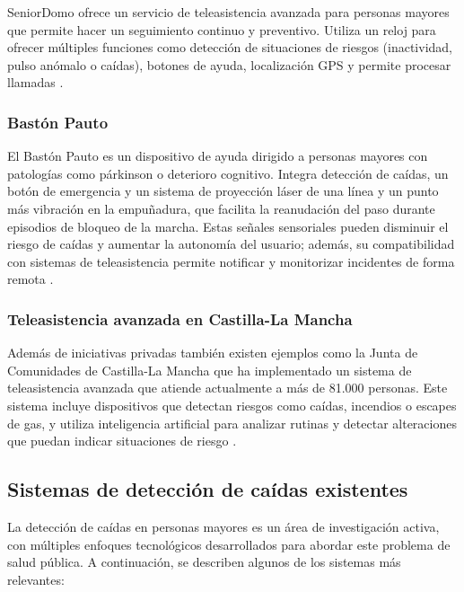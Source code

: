 \documentclass[12pt, a4paper]{article}
\begin{document}
	SeniorDomo ofrece un servicio de teleasistencia avanzada para personas mayores que permite hacer un seguimiento continuo y preventivo. Utiliza un reloj para ofrecer múltiples funciones como detección de situaciones de riesgos (inactividad, pulso anómalo o caídas), botones de ayuda, localización GPS y permite procesar llamadas \cite{seniordomo}.
	
	\subsubsection{Bastón Pauto}
	

	El Bastón Pauto es un dispositivo de ayuda dirigido a personas mayores con patologías como párkinson o deterioro cognitivo. Integra detección de caídas, un botón de emergencia y un sistema de proyección láser de una línea y un punto más vibración en la empuñadura, que facilita la reanudación del paso durante episodios de bloqueo de la marcha. Estas señales sensoriales pueden disminuir el riesgo de caídas y aumentar la autonomía del usuario; además, su compatibilidad con sistemas de teleasistencia permite notificar y monitorizar incidentes de forma remota \cite{Pauto2019}.
	
	\subsubsection{Teleasistencia avanzada en Castilla-La Mancha}
	
	Además de iniciativas privadas también existen ejemplos como la Junta de Comunidades de Castilla-La Mancha que ha implementado un sistema de teleasistencia avanzada que atiende actualmente a más de 81.000 personas. Este sistema incluye dispositivos que detectan riesgos como caídas, incendios o escapes de gas, y utiliza inteligencia artificial para analizar rutinas y detectar alteraciones que puedan indicar situaciones de riesgo \cite{castillalamancha2025}.
	


	\subsection{Sistemas de detección de caídas existentes}


	La detección de caídas en personas mayores es un área de investigación activa, con múltiples enfoques tecnológicos desarrollados para abordar este problema de salud pública. A continuación, se describen algunos de los sistemas más relevantes:
		
\end{document}
